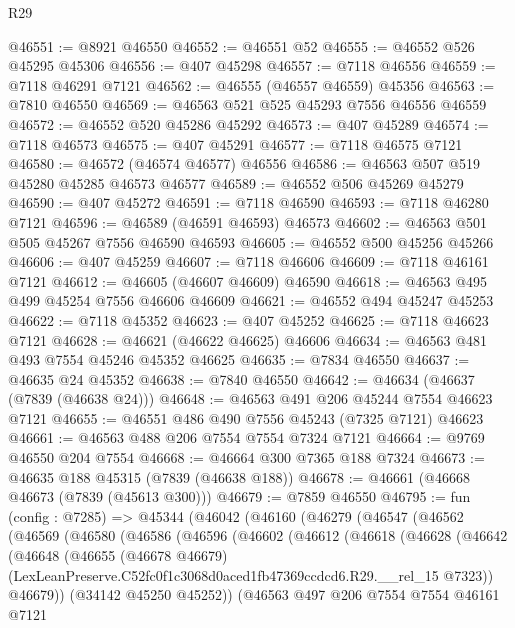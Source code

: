 \begin{lexlean}{R29}
\begin{coremodule}
@46551 := @8921 @46550
@46552 := @46551 @52
@46555 := @46552 @526 @45295 @45306
@46556 := @407 @45298
@46557 := @7118 @46556
@46559 := @7118 @46291 @7121
@46562 := @46555 (@46557 @46559) @45356
@46563 := @7810 @46550
@46569 := @46563 @521 @525 @45293 @7556 @46556 @46559
@46572 := @46552 @520 @45286 @45292
@46573 := @407 @45289
@46574 := @7118 @46573
@46575 := @407 @45291
@46577 := @7118 @46575 @7121
@46580 := @46572 (@46574 @46577) @46556
@46586 := @46563 @507 @519 @45280 @45285 @46573 @46577
@46589 := @46552 @506 @45269 @45279
@46590 := @407 @45272
@46591 := @7118 @46590
@46593 := @7118 @46280 @7121
@46596 := @46589 (@46591 @46593) @46573
@46602 := @46563 @501 @505 @45267 @7556 @46590 @46593
@46605 := @46552 @500 @45256 @45266
@46606 := @407 @45259
@46607 := @7118 @46606
@46609 := @7118 @46161 @7121
@46612 := @46605 (@46607 @46609) @46590
@46618 := @46563 @495 @499 @45254 @7556 @46606 @46609
@46621 := @46552 @494 @45247 @45253
@46622 := @7118 @45352
@46623 := @407 @45252
@46625 := @7118 @46623 @7121
@46628 := @46621 (@46622 @46625) @46606
@46634 := @46563 @481 @493 @7554 @45246 @45352 @46625
@46635 := @7834 @46550
@46637 := @46635 @24 @45352
@46638 := @7840 @46550
@46642 := @46634 (@46637 (@7839 (@46638 @24)))
@46648 := @46563 @491 @206 @45244 @7554 @46623 @7121
@46655 := @46551 @486 @490 @7556 @45243 (@7325 @7121) @46623
@46661 := @46563 @488 @206 @7554 @7554 @7324 @7121
@46664 := @9769 @46550 @204 @7554
@46668 := @46664 @300 @7365 @188 @7324
@46673 := @46635 @188 @45315 (@7839 (@46638 @188))
@46678 := @46661 (@46668 @46673 (@7839 (@45613 @300)))
@46679 := @7859 @46550
@46795 := fun (config : @7285) =>
  @45344
    (@46042
      (@46160
        (@46279
          (@46547
            (@46562
              (@46569
                (@46580
                  (@46586
                    (@46596
                      (@46602
                        (@46612
                          (@46618
                            (@46628
                              (@46642
                                (@46648
                                  (@46655
                                    (@46678 @46679)
                                    (LexLeanPreserve.C52fc0f1c3068d0aced1fb47369ccdcd6.R29.__rel_15
                                      @7323))
                                  @46679))
                              (@34142 @45250 @45252))
                            (@46563
                              @497
                              @206
                              @7554
                              @7554
                              @46161
                              @7121

\end{coremodule}
\end{lexlean}
